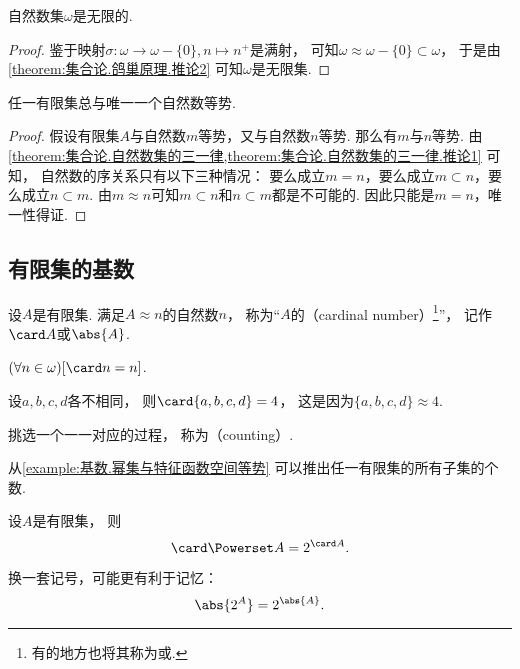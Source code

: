 \begin{corollary}\label{theorem:集合论.鸽巢原理.推论3}
自然数集\(\omega\)是无限的.
\begin{proof}
鉴于映射\(\sigma\colon \omega \to \omega-\{0\}, n \mapsto n^+\)是满射，
可知\(\omega \approx \omega-\{0\} \subset \omega\)，
于是由\cref{theorem:集合论.鸽巢原理.推论2} 可知\(\omega\)是无限集.
\end{proof}
\end{corollary}

\begin{corollary}
任一有限集总与唯一一个自然数等势.
\begin{proof}
假设有限集\(A\)与自然数\(m\)等势，又与自然数\(n\)等势.
那么有\(m\)与\(n\)等势.
由\cref{theorem:集合论.自然数集的三一律,theorem:集合论.自然数集的三一律.推论1} 可知，
自然数的序关系只有以下三种情况：
要么成立\(m = n\)，要么成立\(m \subset n\)，要么成立\(n \subset m\).
由\(m \approx n\)可知\(m \subset n\)和\(n \subset m\)都是不可能的.
因此只能是\(m = n\)，唯一性得证.
\end{proof}
\end{corollary}

\subsection{有限集的基数}
\begin{definition}
设\(A\)是有限集.
满足\(A \approx n\)的自然数\(n\)，
称为“\(A\)的（cardinal number）\footnote{%
有的地方也将其称为或.}”，
记作\(\card A\)或\(\abs{A}\).
\end{definition}

\begin{example}
\((\forall n\in\omega)[\card n = n]\).
\end{example}

\begin{example}
设\(a,b,c,d\)各不相同，
则\(\card\{a,b,c,d\} = 4\)，
这是因为\(\{a,b,c,d\} \approx 4\).
\end{example}

挑选一个一一对应的过程，
称为（counting）.

从\cref{example:基数.幂集与特征函数空间等势} 可以推出任一有限集的所有子集的个数.
\begin{theorem}
设\(A\)是有限集，
则\begin{equation}
	\card \Powerset A
	= 2^{\card A}.
\end{equation}
\end{theorem}
\begin{remark}
换一套记号，可能更有利于记忆：\begin{equation*}
	\abs{2^A}
	= 2^{\abs{A}}.
\end{equation*}
\end{remark}

